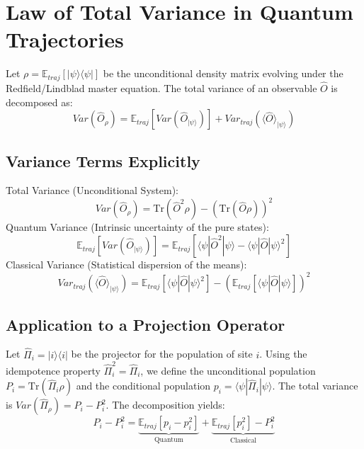 \documentclass[a4paper,12pt]{article}
\begin{document}
\section{Law of Total Variance in Quantum Trajectories}

Let $\rho = \mathbb{E}_{traj}[|\psi\rangle\langle\psi|]$ be the unconditional density matrix evolving under the Redfield/Lindblad master equation. The total variance of an observable $\hat{O}$ is decomposed as:
\begin{equation}
	Var(\hat{O}_{\rho}) = \mathbb{E}_{traj}[Var(\hat{O}_{|\psi\rangle})] + Var_{traj}(\langle\hat{O}\rangle_{|\psi\rangle})
\end{equation}

\subsection{Variance Terms Explicitly}
Total Variance (Unconditional System):
\begin{equation}
	Var(\hat{O}_{\rho}) = \text{Tr}(\hat{O}^2\rho) - (\text{Tr}(\hat{O}\rho))^2
\end{equation}
Quantum Variance (Intrinsic uncertainty of the pure states):
\begin{equation}
	\mathbb{E}_{traj}[Var(\hat{O}_{|\psi\rangle})] = \mathbb{E}_{traj}[\langle\psi|\hat{O}^2|\psi\rangle - \langle\psi|\hat{O}|\psi\rangle^2]
\end{equation}
Classical Variance (Statistical dispersion of the means):
\begin{equation}
	Var_{traj}(\langle\hat{O}\rangle_{|\psi\rangle}) = \mathbb{E}_{traj}[\langle\psi|\hat{O}|\psi\rangle^2] - (\mathbb{E}_{traj}[\langle\psi|\hat{O}|\psi\rangle])^2
\end{equation}

\subsection{Application to a Projection Operator}
Let $\hat{\Pi}_i = |i\rangle\langle i|$ be the projector for the population of site $i$. Using the idempotence property $\hat{\Pi}_i^2 = \hat{\Pi}_i$, we define the unconditional population $P_i = \text{Tr}(\hat{\Pi}_i \rho)$ and the conditional population $p_i = \langle\psi|\hat{\Pi}_i|\psi\rangle$. The total variance is $Var(\hat{\Pi}_{\rho}) = P_i - P_i^2$. The decomposition yields:
\begin{equation}
	P_i - P_i^2 = \underbrace{\mathbb{E}_{traj}[p_i - p_i^2]}_{\text{Quantum}} + \underbrace{\mathbb{E}_{traj}[p_i^2] - P_i^2}_{\text{Classical}}
\end{equation}
\end{document}
